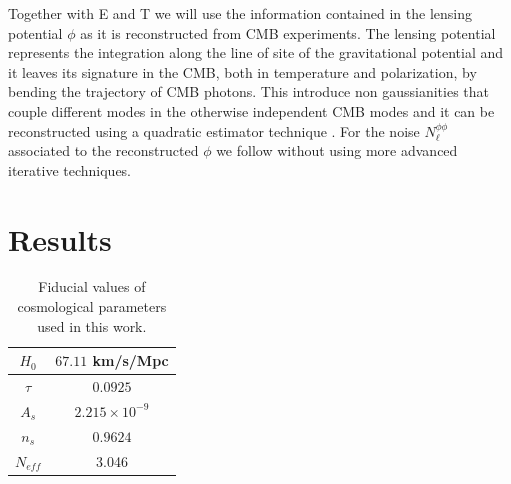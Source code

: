 \documentclass[aps,prd,preprint,groupedaddress]{revtex4-1}
\begin{document}
Together with E and T we will use the information contained in the lensing potential $\phi$ as it is reconstructed from CMB experiments. The lensing potential represents the integration along the line of site of the gravitational potential and it leaves its signature in the CMB, both in temperature and polarization, by bending the trajectory of CMB photons. This introduce non gaussianities that couple different modes in the otherwise independent CMB modes and it can be reconstructed using a quadratic estimator technique \cite{okamoto:2003,hu:2002}.
For the noise $N_\ell^{\phi\phi}$ associated to the reconstructed $\phi$ we follow \cite{okamoto:2003,hu:2002} without using more advanced iterative techniques.




%




\section{Results \label{sec:results}}

\begin{table}[htdp]
\begin{center}
\begin{tabular}{|c|c|}
\hline
$H_{0}$ & $67.11$ km/s/Mpc\\
\hline
\hline
$\tau$ & $0.0925$ \\
\hline

\hline
$A_{s}$ &$2.215 \times 10^{-9}$ \\
\hline

\hline
$n_{s}$ & $0.9624$ \\
\hline

\hline
$N_{eff}$ & 3.046\\
\hline
\end{tabular}
\end{center}
\caption{Fiducial values of cosmological parameters used in this work.}
\label{default}
\end{table}%
\end{document}
